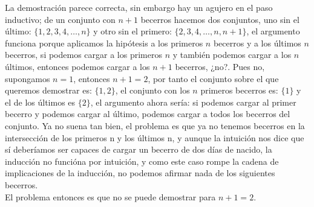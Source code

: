 \documentclass[spanish,12pt,letterpaper]{article}
\begin{document}
\noindent La demostración parece correcta, sin embargo hay un agujero en el paso
inductivo; de un conjunto con $n+1$ becerros hacemos dos conjuntos, uno sin el
último: $\{1,2,3,4,\dots,n\}$ y otro sin el primero: $\{2,3,4,\dots,n,n+1 \}$,
el argumento funciona porque aplicamos la hipótesis a los primeros $n$ becerros
y a los últimos $n$ becerros, si podemos cargar a los primeros $n$ y también
podemos cargar a los $n$ últimos, entonces podemos cargar a los $n+1$ becerros,
¿no?. Pues no, supongamos $n=1$, entonces $n+1=2$, por tanto el conjunto sobre
el que queremos demostrar es: $\{1,2\}$, el conjunto con los $n$ primeros
becerros es: $\{1\}$ y el de los últimos es $\{2\}$, el argumento ahora sería:
si podemos cargar al primer becerro y podemos cargar al último, podemos cargar
a todos los becerros del conjunto. Ya no suena tan bien, el problema es que ya
no tenemos becerros en la intersección de los primeros n y los últimos n, y
aunque la intuición nos dice que sí deberíamos ser capaces de cargar un becerro
de dos días de nacido, la inducción no funcióna por intuición, y como este caso rompe la cadena de implicaciones de la
inducción, no podemos afirmar nada de los siguientes becerros.\\
El problema entonces es que no se puede demostrar para $n+1=2$.
\end{document}
